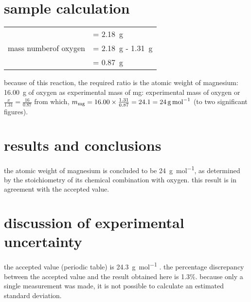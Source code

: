 \documentclass{article}
\begin{document}
\section{sample calculation}

\begin{tabular}{ll}
  & = \SI{2.18}{\gram}\\
  mass numberof oxygen & = \SI{2.18}{\gram} - \SI{1.31}{\gram}\\
  & = \SI{0.87}{\gram}
\end{tabular}

because of this reaction, the required ratio is the atomic weight of
magnesium: \SI{16.00}{\gram} of oxygen as experimental mass of mg:
experimental mass of oxygen or $\frac{x}{1.31}=\frac{16}{0.87}$ from
which, $m_{\ce{mg}} = 16.00 \times \frac{1.31}{0.87} = 24.1 =
\SI{24}{\gram\per\mole}$ (to two significant figures).


\section{results and conclusions}

the atomic weight of magnesium is concluded to be
\SI{24}{\gram\per\mol}, as determined by the stoichiometry of its
chemical combination with oxygen. this result is in agreement with the
accepted value.



\section{discussion of experimental uncertainty}

the accepted value (periodic table) is \SI{24.3}{\gram\per\mole}
\cite{smith:2012qr}. the percentage discrepancy between the accepted
value and the result obtained here is 1.3\%. because only a single
measurement was made, it is not possible to calculate an estimated
standard deviation.
\end{document}
